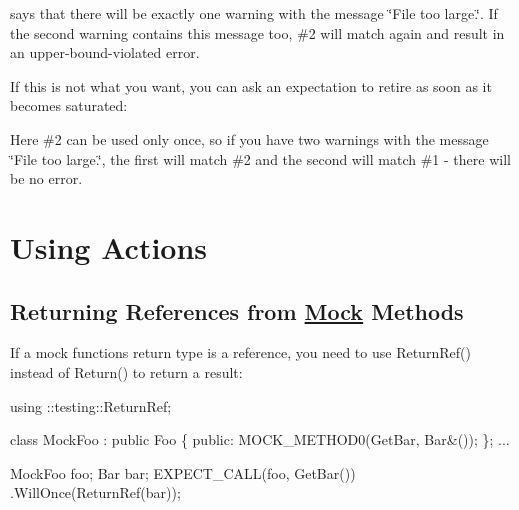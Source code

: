 

says that there will be exactly one warning with the message {\ttfamily \char`\"{}\+File
too large.\char`\"{}}. If the second warning contains this message too, \#2 will match again and result in an upper-\/bound-\/violated error.

If this is not what you want, you can ask an expectation to retire as soon as it becomes saturated\+:




Here \#2 can be used only once, so if you have two warnings with the message {\ttfamily \char`\"{}\+File too large.\char`\"{}}, the first will match \#2 and the second will match \#1 -\/ there will be no error.

\section*{Using Actions}

\subsection*{Returning References from \hyperlink{classMock}{Mock} Methods}

If a mock function\textquotesingle{}s return type is a reference, you need to use {\ttfamily Return\+Ref()} instead of {\ttfamily Return()} to return a result\+:


\begin{DoxyCode}
using ::testing::ReturnRef;

\textcolor{keyword}{class }MockFoo : \textcolor{keyword}{public} Foo \{
 \textcolor{keyword}{public}:
  MOCK\_METHOD0(GetBar, Bar&());
\};
...

  MockFoo foo;
  Bar bar;
  EXPECT\_CALL(foo, GetBar())
      .WillOnce(ReturnRef(bar));
\end{DoxyCode}


